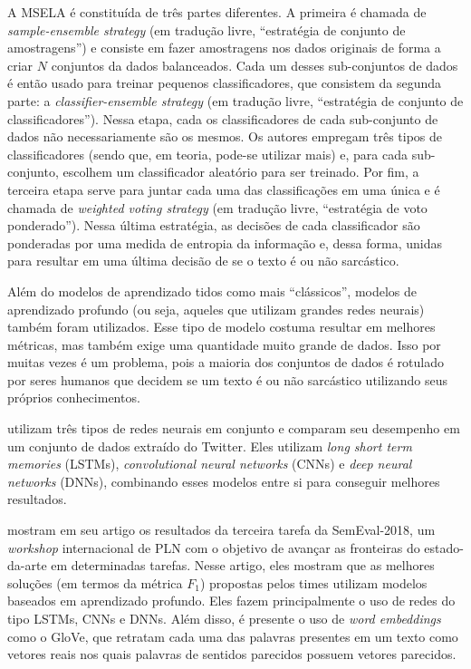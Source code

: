A MSELA é constituída de três partes diferentes. A primeira é chamada de
\textit{sample-ensemble strategy} (em tradução livre, ``estratégia de conjunto
de amostragens'') e consiste em fazer amostragens nos dados originais de forma a
criar $N$ conjuntos da dados balanceados. Cada um desses sub-conjuntos de dados
é então usado para treinar pequenos classificadores, que consistem da segunda
parte: a \textit{classifier-ensemble strategy} (em tradução livre, ``estratégia
de conjunto de classificadores''). Nessa etapa, cada os classificadores de cada
sub-conjunto de dados não necessariamente são os mesmos. Os autores empregam
três tipos de classificadores (sendo que, em teoria, pode-se utilizar mais) e,
para cada sub-conjunto, escolhem um classificador aleatório para ser treinado.
Por fim, a terceira etapa serve para juntar cada uma das classificações em uma
única e é chamada de \textit{weighted voting strategy} (em tradução livre,
``estratégia de voto ponderado''). Nessa última estratégia, as decisões de cada
classificador são ponderadas por uma medida de entropia da informação e, dessa
forma, unidas para resultar em uma última decisão de se o texto é ou não
sarcástico.

Além do modelos de aprendizado tidos como mais ``clássicos'', modelos de
aprendizado profundo (ou seja, aqueles que utilizam grandes redes neurais)
também foram utilizados. Esse tipo de modelo costuma resultar em melhores
métricas, mas também exige uma quantidade muito grande de dados. Isso por muitas
vezes é um problema, pois a maioria dos conjuntos de dados é rotulado por seres
humanos que decidem se um texto é ou não sarcástico utilizando seus próprios
conhecimentos.

\cite{ghosh-veale:2016:fracking-sarcasm-nn} utilizam três tipos de redes neurais
em conjunto e comparam seu desempenho em um conjunto de dados extraído do
Twitter. Eles utilizam \textit{long short term memories} (LSTMs),
\textit{convolutional neural networks} (CNNs) e \textit{deep neural networks}
(DNNs), combinando esses modelos entre si para conseguir melhores resultados.

\cite{van-hee-etal:2018:semeval} mostram em seu artigo os resultados da terceira
tarefa da SemEval-2018, um \textit{workshop} internacional de PLN com o objetivo
de avançar as fronteiras do estado-da-arte em determinadas tarefas. Nesse
artigo, eles mostram que as melhores soluções (em termos da métrica $F_1$)
propostas pelos times utilizam modelos baseados em aprendizado profundo. Eles
fazem principalmente o uso de redes do tipo LSTMs, CNNs e DNNs. Além disso, é
presente o uso de \textit{word embeddings} como o GloVe, que retratam cada uma
das palavras presentes em um texto como vetores reais nos quais palavras de
sentidos parecidos possuem vetores parecidos.

